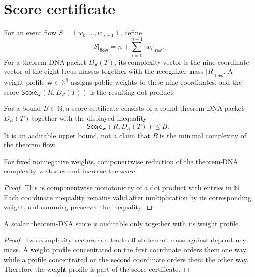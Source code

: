 \section{Score certificate}
\label{sec:tdcs-score-certificate}

\begin{definition}
\label{def:tdcs-flow-mass-score}
For an event flow $S=(w_0,\ldots,w_{n-1})$, define
$$
|S|_{\mathsf{flow}}=
n+\sum_{i=0}^{n-1}|w_i|_{\mathsf{raw}}.
$$
For a theorem-DNA packet $D_R(T)$, its complexity vector is the nine-coordinate
vector of the eight locus masses together with the recognizer mass
$|R|_{\mathsf{flow}}$. A weight profile
$\mathbf w\in\mathbb N^9$ assigns public weights to these nine coordinates,
and the score $\mathsf{Score}_{\mathbf w}(R,D_R(T))$ is the resulting dot
product.
\end{definition}

\begin{definition}
\label{def:tdcs-score-certificate}
For a bound $B\in\mathbb N$, a score certificate consists of a sound
theorem-DNA packet $D_R(T)$ together with the displayed inequality
$$
\mathsf{Score}_{\mathbf w}(R,D_R(T))\leq B.
$$
It is an auditable upper bound, not a claim that $B$ is the minimal complexity
of the theorem flow.
\end{definition}

\begin{theorem}
\label{thm:tdcs-score-monotonicity}
For fixed nonnegative weights, componentwise reduction of the theorem-DNA
complexity vector cannot increase the score.
\end{theorem}
\begin{proof}
This is componentwise monotonicity of a dot product with entries in
$\mathbb N$. Each coordinate inequality remains valid after multiplication by
its corresponding weight, and summing preserves the inequality.
\end{proof}

\begin{theorem}
\label{thm:tdcs-scalar-score-depends-on-weight-profile}
A scalar theorem-DNA score is auditable only together with its weight profile.
\end{theorem}
\begin{proof}
Two complexity vectors can trade off statement mass against dependency mass.
A weight profile concentrated on the first coordinate orders them one way,
while a profile concentrated on the second coordinate orders them the other
way. Therefore the weight profile is part of the score certificate.
\end{proof}

